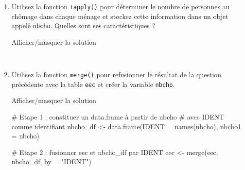 \documentclass[12pt,]{article}
\newenvironment{Shaded}{}{}
\newcommand{\KeywordTok}[1]{\textcolor[rgb]{0.00,0.00,1.00}{{#1}}}
\newcommand{\DataTypeTok}[1]{{#1}}
\newcommand{\StringTok}[1]{\textcolor[rgb]{0.00,0.50,0.50}{{#1}}}
\newcommand{\CommentTok}[1]{\textcolor[rgb]{0.00,0.50,0.00}{{#1}}}
\newcommand{\OtherTok}[1]{\textcolor[rgb]{1.00,0.25,0.00}{{#1}}}
\newcommand{\NormalTok}[1]{{#1}}
\begin{document}
\begin{enumerate}
\def\labelenumi{\alph{enumi}.}
\item
  Utilisez la fonction \texttt{tapply()} pour déterminer le nombre de
  personnes au chômage dans chaque ménage et stockez cette information
  dans un objet appelé \texttt{nbcho}. Quelles sont ses caractéristiques
  ?

  Afficher/masquer la solution

  \hypertarget{sol44}{}
\begin{Shaded}
\end{Shaded}

  ~
\item
  Utilisez la fonction \texttt{merge()} pour refusionner le résultat de
  la question précédente avec la table \texttt{eec} et créer la variable
  \texttt{nbcho}.

  Afficher/masquer la solution

  \hypertarget{sol45}{}
\begin{Shaded}
\begin{Highlighting}[]
\CommentTok{# Etape 1 : constituer un data.frame à partir de nbcho }
\CommentTok{# avec IDENT comme identifiant}
\NormalTok{nbcho_df <-}\StringTok{ }\KeywordTok{data.frame}\NormalTok{(}\DataTypeTok{IDENT =} \KeywordTok{names}\NormalTok{(nbcho), }\DataTypeTok{nbcho1 =} \NormalTok{nbcho)}

\CommentTok{# Etape 2 : fusionner eec et nbcho_df par IDENT}
\NormalTok{eec <-}\StringTok{ }\KeywordTok{merge}\NormalTok{(eec, nbcho_df, }\DataTypeTok{by =} \StringTok{"IDENT"}\NormalTok{)}
\end{Highlighting}
\end{Shaded}


\end{enumerate}
\end{document}
